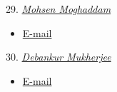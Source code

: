 29. \href{https://www.isye.gatech.edu/users/mohsen-moghaddam}{\emph{Mohsen Moghaddam}}
\begin{itemize}
    \item \href{mailto:mohsen.moghaddam@gatech.edu}{E-mail}
\end{itemize}

30. \href{https://www.debankur-mukherjee.com/}{\emph{Debankur Mukherjee}}
\begin{itemize}
    \item \href{mailto:debankur.mukherjee@isye.gatech.edu}{E-mail}
\end{itemize}


